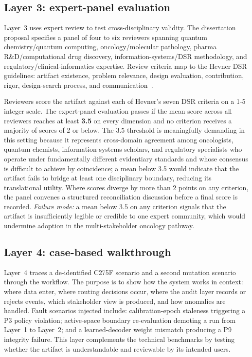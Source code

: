 \documentclass[11pt,letterpaper]{article}
\begin{document}
\subsection{Layer 3: expert-panel evaluation}

Layer~3 uses expert review to test cross-disciplinary validity.  The dissertation proposal
specifies a panel of four to six reviewers spanning quantum chemistry/quantum computing,
oncology/molecular pathology, pharma R\&D/computational drug discovery,
information-systems/DSR methodology, and regulatory/clinical-informatics expertise.  Review
criteria map to the Hevner DSR guidelines: artifact existence, problem relevance, design
evaluation, contribution, rigor, design-search process, and communication~\cite{hevner2004}.

Reviewers score the artifact against each of Hevner's seven DSR criteria on a 1-5 integer
scale.  The expert-panel evaluation passes if the mean score across all reviewers reaches at
least \textbf{3.5} on every dimension and no criterion receives a majority of scores of 2 or
below.  The 3.5 threshold is meaningfully demanding in this setting because it represents
cross-domain agreement among oncologists, quantum chemists, information-systems scholars, and
regulatory specialists who operate under fundamentally different evidentiary standards and
whose consensus is difficult to achieve by coincidence; a mean below 3.5 would indicate that
the artifact fails to bridge at least one disciplinary boundary, reducing its translational
utility.  Where scores diverge by more than 2 points on any criterion, the panel convenes a
structured reconciliation discussion before a final score is recorded.
\textit{Failure mode:} a mean below 3.5 on any criterion signals that the artifact is
insufficiently legible or credible to one expert community, which would undermine adoption
in the multi-stakeholder oncology pathway.

\subsection{Layer 4: case-based walkthrough}
\label{sec:walkthrough}

Layer~4 traces a de-identified C275F scenario and a second mutation scenario through the
workflow.  The purpose is to show how the system works in context: where data enter, where
routing decisions occur, where the audit layer records or rejects events, which stakeholder
view is produced, and how anomalies are handled.  Fault scenarios injected include:
calibration-epoch staleness triggering a P3 policy violation; active-space boundary
re-evaluation demoting a run from Layer~1 to Layer~2; and a learned-decoder weight
mismatch producing a P9 integrity failure.  This layer complements the technical benchmarks
by testing whether the artifact is understandable and reviewable by its intended users.
\end{document}
